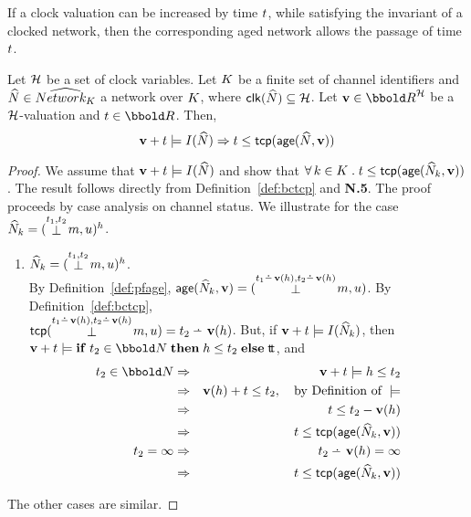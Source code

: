 If a clock valuation can be increased by time ${t}$, while satisfying 
the invariant of a clocked network, then the corresponding aged network
allows the passage of time ${t}$.
\begin{lemma}\label{lem:pfnetprogress}
Let $\clocks$ be a set of clock variables. 
Let ${K}$ be a finite set of channel identifiers and ${\widehat{N}} \in \widehat{Network_{{K}}}$
a network over ${K}$, where $\clk(\NN) \subseteq \clocks$. 
Let $\clkvl \in \clkvls$ be a $\clocks$-valuation and 
$\ti \in \Time$. Then,
\[
\mathbf{v} + {t} \models I({\widehat{N}}) \Rightarrow {t} \leq {\mathop{\sf tcp}}(\mathop{\sf age}({\widehat{N}},\mathbf{v}))
\]
\end{lemma}
\begin{proof}
We assume that $\mathbf{v} + {t} \models I({\widehat{N}})$ and show that
$\forall \kk \in \K \such \ti \leq \tcp(\age(\NN_\kk,\clkvl))$.
The result follows directly from Definition~\ref{def:bctcp} and
\textbf{N.5}. The proof proceeds by case analysis on 
channel status. We illustrate for the case 
${\widehat{N}}_{k} = ({\mathrel{\stackrel{{t}_1,{t}_2}{\bot}}\negthinspace{m}},u)^h$.
\begin{enumerate}
\item \case ${\widehat{N}}_{k} = ({\mathrel{\stackrel{{t}_1,{t}_2}{\bot}}\negthinspace{m}},u)^h$. \\
By Definition~\ref{def:pfage}, $\age(\NN_\kk,\clkvl) = (\preact{\ti_1\nmin\clkvl(\clock),\ti_2\nmin\clkvl(\clock)}{\mm},\mq)$. 
By Definition~\ref{def:bctcp}, \\
$\tcp(\preact{\ti_1\nmin\clkvl(\clock),\ti_2\nmin\clkvl(\clock)}{\mm},\mq) =
\ti_2\nmin\clkvl(\clock)$. But, if $\mathbf{v} + {t} \models I({\widehat{N}}_{k})$, then
$\clkvl + \ti \models \ite{\ti_2 \in \nat}{\clock \leq \ti_2}{\cctrue}$, and
\begin{eqnarray*}
\ti_2 \in \nat & \implies & \clkvl + \ti \models \clock \leq \ti_2 \\
               & \implies & \clkvl(\clock) + \ti \leq \ti_2, \quad \text{by Definition of } \models \\
               & \implies & \ti \leq \ti_2 - \clkvl(\clock) \\
               & \implies & \ti \leq \tcp(\age(\NN_\kk, \clkvl)) \\ 
\ti_2 = \infty & \implies & \ti_2 \nmin \clkvl(\clock) = \infty \\
               & \implies & \ti \leq \tcp(\age(\NN_\kk, \clkvl))               
\end{eqnarray*}
\end{enumerate} 
The other cases are similar.
\end{proof}

